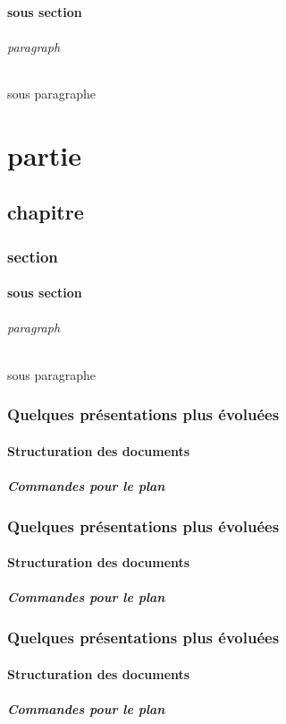 \documentclass{report}
\begin{document}
\subsection{sous section}
\paragraph{paragraph}
\subparagraph{sous paragraphe}

\part{partie}
\chapter{chapitre}
\section{section}
\subsection{sous section}
\paragraph{paragraph}
\subparagraph{sous paragraphe}

\section{Quelques présentations plus évoluées}
\subsection{Structuration des documents}
\subsubsection{Commandes pour le plan}

\section{Quelques présentations plus évoluées}
\subsection{Structuration des documents}
\subsubsection{Commandes pour le plan}

\section{Quelques présentations plus évoluées}
\subsection{Structuration des documents}
\subsubsection{Commandes pour le plan}

\end{document}
